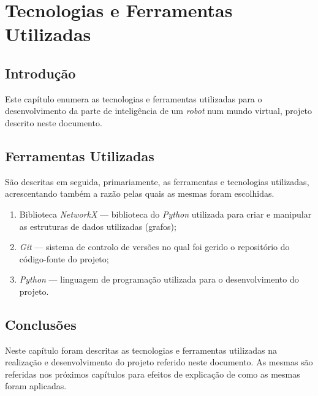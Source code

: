 \chapter{Tecnologias e Ferramentas Utilizadas}
\label{ch::tecno}

\section{Introdução}
\label{sec::tecno:intro}

Este capítulo enumera as tecnologias e ferramentas utilizadas para o desenvolvimento da parte de inteligência de um \emph{robot} num mundo virtual, projeto descrito neste documento.


\section{Ferramentas Utilizadas}
\label{sec::tecno:ferr}

São descritas em seguida, primariamente, as ferramentas e tecnologias utilizadas, acrescentando também a razão pelas quais as mesmas foram escolhidas.

\begin{enumerate}
    \item Biblioteca \emph{NetworkX} \cite{NetworkX} --- biblioteca do \emph{Python} \cite{Python} utilizada para criar e manipular as estruturas de dados utilizadas (grafos);
    
    \item \emph{Git} --- sistema de controlo de versões no qual foi gerido o repositório do código-fonte do projeto;
    
    \item \emph{Python} \cite{Python} --- linguagem de programação utilizada para o desenvolvimento do projeto.
    
\end{enumerate}


\section{Conclusões}
\label{sec::tecno:conc}

Neste capítulo foram descritas as tecnologias e ferramentas utilizadas na realização e desenvolvimento do projeto referido neste documento. As mesmas são referidas nos próximos capítulos para efeitos de explicação de como as mesmas foram aplicadas.